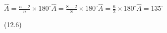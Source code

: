 {\begin{mdframed}[linewidth=4, leftmargin=40, rightmargin=40]
\begin{exercise}
\begin{enumerate}[noitemsep, label=\textbf{Step} \textbf{\arabic*}. ]
{    }{%
    \setlength{\mymathboxwidth}{\columnwidth}
      \addtolength{\mymathboxwidth}{-48pt}
    \par\vspace{12pt}\noindent\begin{minipage}{\columnwidth}
    \parbox[t]{\mymathboxwidth}{\large\begin{math}
    \hat{A}=\frac{n-2}{n}\ensuremath{\times}{180}^{\circ }\hat{A}=\frac{8-2}{8}\ensuremath{\times}{180}^{\circ }\hat{A}=\frac{6}{2}\ensuremath{\times}{180}^{\circ }\hat{A}={135}^{\circ }\end{math}}\hfill
    \parbox[t]{48pt}{\raggedleft 
    (12.6)}
    \end{minipage}\vspace{12pt}\par
    }%
\end{enumerate}
    \end{exercise}
    \end{mdframed}
    }
    \noindent
%        
%     
%     
    \label{m39354*cid2}
